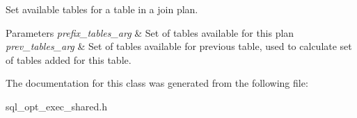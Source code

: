 Set available tables for a table in a join plan.


\begin{DoxyParams}{Parameters}
{\em prefix\+\_\+tables\+\_\+arg} & Set of tables available for this plan \\
\hline
{\em prev\+\_\+tables\+\_\+arg} & Set of tables available for previous table, used to calculate set of tables added for this table. \\
\hline
\end{DoxyParams}


The documentation for this class was generated from the following file\+:\begin{DoxyCompactItemize}
\item 
sql\+\_\+opt\+\_\+exec\+\_\+shared.\+h\end{DoxyCompactItemize}
